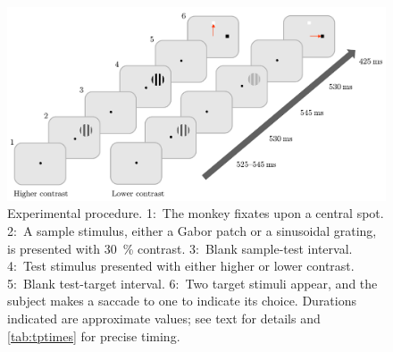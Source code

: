 \begin{figure}[tbhp]
\begin{center}
\includegraphics[width=\linewidth]{figs/task/PLtask1.pdf}
\end{center}
\caption{
Experimental procedure.
1:~The monkey fixates upon a central spot.
2:~A sample stimulus, either a Gabor patch or a sinusoidal grating, is presented with \SI{30}{\percent} contrast.
3:~Blank sample-test interval.
4:~Test stimulus presented with either higher or lower contrast.
5:~Blank test-target interval.
6:~Two target stimuli appear, and the subject makes a saccade to one to indicate its choice.
Durations indicated are approximate values; see text for details and \autoref{tab:tptimes} for precise timing.
}
\label{fig:pltask1}
\end{figure}



